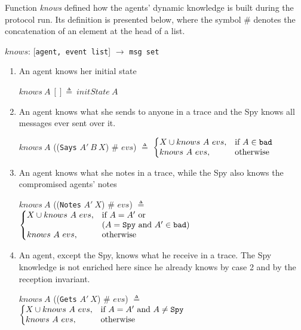 Function \textit{knows} defined how the agents' dynamic knowledge is built during the protocol run. Its definition is presented below, where the symbol \#  denotes the concatenation of an element at the head of a list.
%
\begin{center}
  \(knows\): [\texttt{agent, event list}] \(\longrightarrow \) \texttt{msg set}
\end{center}
%
\begin{enumerate}
  \item An agent knows her initial state
  \begin{center}
    \(knows\ A\ [] \triangleq\ initState\ A\)
  \end{center}
  \item An agent knows what she sends to anyone in a trace and the Spy knows all messages ever sent over it.
  \begin{center}
    \(knows\ A\) ((\texttt{Says} \(A'\ B \ X\)) \# \(evs\)) \(\triangleq \)
    \(\left \{
      \begin{array}{@{}ll@{}}
        {X} \cup knows\ A\ evs, & \text{if } A \in \texttt{bad} \\
        knows\ A\ evs, & \text{otherwise}
      \end{array} \right.\)
  \end{center}
  \item An agent knows what she notes in a trace, while the Spy also knows the compromised agents' notes
  \begin{center}
    \(knows\ A\) ((\texttt{Notes} \(A'\ X\)) \# \(evs\)) \(\triangleq \)
    \(\left \{
      \begin{array}{@{}ll@{}}
        {X} \cup knows\ A\ evs, & \text{if } A = A' \text{ or } \\ & (A = \texttt{Spy} \text{ and } A' \in \texttt{bad}) \\
        knows\ A\ evs, & \text{otherwise}
      \end{array} \right.\)
  \end{center}
  \item An agent, except the Spy, knows what he receive in a trace. The Spy knowledge is not enriched here since he already knows by case 2 and by the reception invariant.
  \begin{center}
    \(knows\ A\) ((\texttt{Gets} \(A'\ X\)) \# \(evs\)) \(\triangleq \)
    \(\left \{
      \begin{array}{@{}ll@{}}
        {X} \cup knows\ A\ evs, & \text{if } A = A' \text{ and } A \neq \texttt{Spy} \\
        knows\ A\ evs, & \text{otherwise}
      \end{array} \right.\)
  \end{center}
\end{enumerate}

